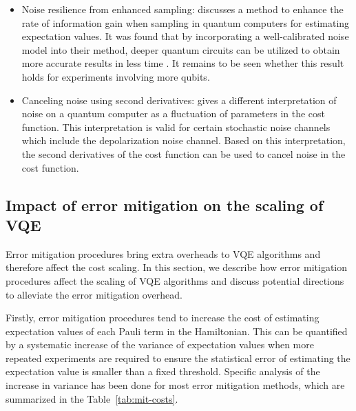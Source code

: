 \begin{itemize}
\item Noise resilience from enhanced sampling: \citet{Wang2021MinimizeEstimationRuntime} discusses a method to enhance the rate of information gain when sampling in quantum computers for estimating expectation values. It was found that by incorporating a well-calibrated noise model into their method, deeper quantum circuits can be utilized to obtain more accurate results in less time \cite{katabarwa2021reducing}. It remains to be seen whether this result holds for experiments involving more qubits.

\item Canceling noise using second derivatives: \citet{ito2021universal} gives a different interpretation of noise on a quantum computer as a fluctuation of parameters in the cost function. This interpretation is valid for certain stochastic noise channels which include the depolarization noise channel. Based on this interpretation, the second derivatives of the cost function can be used to cancel noise in the cost function.


\end{itemize}

\subsection{Impact of error mitigation on the scaling of VQE}

Error mitigation procedures bring extra overheads to VQE algorithms and therefore affect the cost scaling. In this section, we describe how error mitigation procedures affect the scaling of VQE algorithms and discuss potential directions to alleviate the error mitigation overhead.

Firstly, error mitigation procedures
tend to increase the cost of estimating expectation values of each Pauli term in the Hamiltonian. This can be quantified by a systematic increase of the variance of expectation values when more repeated experiments are required to ensure the statistical error of estimating the expectation value is smaller than a fixed threshold. 
Specific analysis of the increase in variance has been done for most error mitigation methods, which are
summarized in the Table~\ref{tab:mit-costs}.

